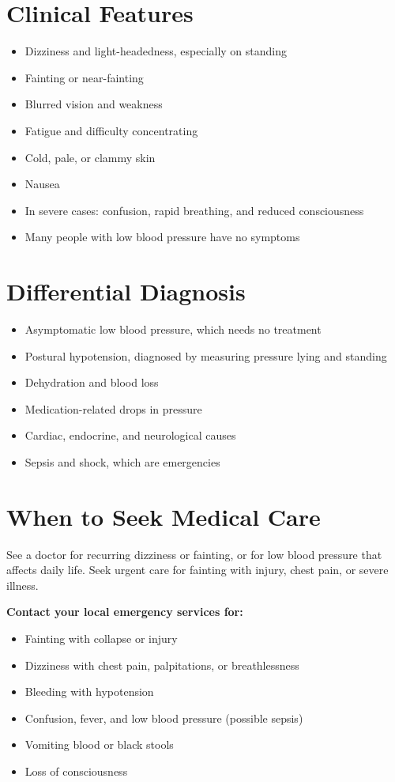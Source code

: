 \section*{Clinical Features}
\begin{itemize}
    \item Dizziness and light-headedness, especially on standing
    \item Fainting or near-fainting
    \item Blurred vision and weakness
    \item Fatigue and difficulty concentrating
    \item Cold, pale, or clammy skin
    \item Nausea
    \item In severe cases: confusion, rapid breathing, and reduced consciousness
    \item Many people with low blood pressure have no symptoms
\end{itemize}

\section*{Differential Diagnosis}
\begin{itemize}
    \item Asymptomatic low blood pressure, which needs no treatment
    \item Postural hypotension, diagnosed by measuring pressure lying and standing
    \item Dehydration and blood loss
    \item Medication-related drops in pressure
    \item Cardiac, endocrine, and neurological causes
    \item Sepsis and shock, which are emergencies
\end{itemize}

\section*{When to Seek Medical Care}
See a doctor for recurring dizziness or fainting, or for low blood pressure that affects daily life. Seek urgent care for fainting with injury, chest pain, or severe illness.

\textbf{Contact your local emergency services for:}
\begin{itemize}
    \item Fainting with collapse or injury
    \item Dizziness with chest pain, palpitations, or breathlessness
    \item Bleeding with hypotension
    \item Confusion, fever, and low blood pressure (possible sepsis)
    \item Vomiting blood or black stools
    \item Loss of consciousness
\end{itemize}

